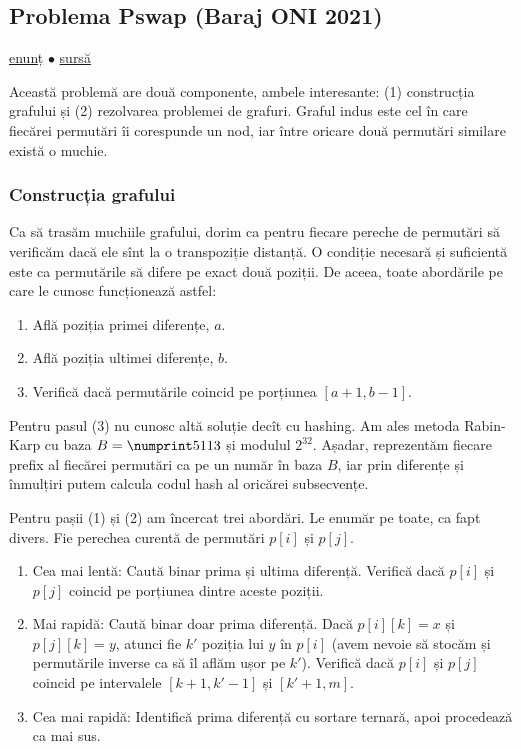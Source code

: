 \documentclass[../main.tex]{subfiles}
\begin{document}
\subsection{Problema Pswap (Baraj ONI 2021)}
\label{problem:pswap}

\href{https://kilonova.ro/problems/78}{enunț}
$\bullet$
\hyperref[code:pswap]{sursă}

Această problemă are două componente, ambele interesante: (1) construcția grafului și (2) rezolvarea problemei de grafuri. Graful indus este cel în care fiecărei permutări îi corespunde un nod, iar între oricare două permutări similare există o muchie.

\subsubsection*{Construcția grafului}

Ca să trasăm muchiile grafului, dorim ca pentru fiecare pereche de permutări să verificăm dacă ele sînt la o transpoziție distanță. O condiție necesară și suficientă este ca permutările să difere pe exact două poziții. De aceea, toate abordările pe care le cunosc funcționează astfel:

\begin{enumerate}
  \item Află poziția primei diferențe, $a$.
  \item Află poziția ultimei diferențe, $b$.
  \item Verifică dacă permutările coincid pe porțiunea $[a+1, b-1]$.
\end{enumerate}

Pentru pasul (3) nu cunosc altă soluție decît cu hashing. Am ales metoda Rabin-Karp cu baza $B = \np{5113}$ și modulul $2^{32}$. Așadar, reprezentăm fiecare prefix al fiecărei permutări ca pe un număr în baza $B$, iar prin diferențe și înmulțiri putem calcula codul hash al oricărei subsecvențe.

Pentru pașii (1) și (2) am încercat trei abordări. Le enumăr pe toate, ca fapt divers. Fie perechea curentă de permutări $p[i]$ și $p[j]$.

\begin{enumerate}
  \item Cea mai lentă: Caută binar prima și ultima diferență. Verifică dacă $p[i]$ și $p[j]$ coincid pe porțiunea dintre aceste poziții.
  \item Mai rapidă: Caută binar doar prima diferență. Dacă $p[i][k] = x$ și $p[j][k] = y$, atunci fie $k'$ poziția lui $y$ în $p[i]$ (avem nevoie să stocăm și permutările inverse ca să îl aflăm ușor pe $k'$). Verifică dacă $p[i]$ și $p[j]$ coincid pe intervalele $[k + 1, k' - 1]$ și $[k' + 1, m]$.
  \item Cea mai rapidă: Identifică prima diferență cu sortare ternară, apoi procedează ca mai sus.
\end{enumerate}
\end{document}
